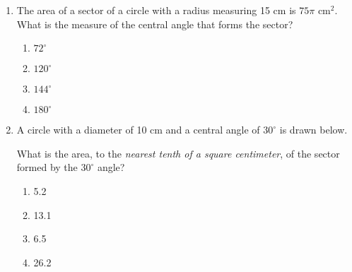 \documentclass[12pt, twoside]{article}
\begin{document}
\begin{enumerate}
  \item %
  The area of a sector of a circle with a radius measuring 15 cm is $75\pi$ $\mathrm{cm}^2$. What is the measure of the central angle that forms the sector?
    \begin{multicols}{2}
      \begin{enumerate}
      \item $72^\circ$
      \item $120^\circ$
      \item $144^\circ$
      \item $180^\circ$
    \end{enumerate}
  \end{multicols}

  \item %
  A circle with a diameter of 10 cm and a central angle of $30^\circ$ is drawn below.
  \begin{center}
    \end{center}
  What is the area, to the \emph{nearest tenth of a square centimeter}, of the sector formed by the $30^\circ$ angle?
    \begin{multicols}{2}
      \begin{enumerate}
      \item 5.2
      \item 13.1
      \item 6.5
      \item 26.2
    \end{enumerate}
    \end{multicols}
    

    
  \end{enumerate}
\end{document}
